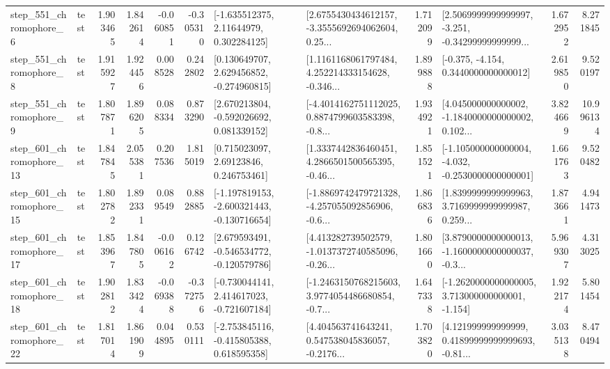\begin{tabular}{llrrrrllrlrr}
   step\_551\_chromophore\_6 &      test &      1.903465 &    1.842614 &     -0.060851 & -0.305310 &     [-1.635512375, 2.11644979, 0.302284125] &  [2.6755430434612157, -3.3555692694062604, 0.25... &       1.712099 &  [2.5069999999999997, -3.251, -0.34299999999999... &            1.672952 &          8.271845 \\
   step\_551\_chromophore\_8 &      test &      1.915927 &    1.924456 &      0.008528 &  0.242802 &    [0.130649707, 2.629456852, -0.274960815] &  [1.1161168061797484, 4.252214333154628, -0.346... &       1.899888 &               [-0.375, -4.154, 0.3440000000000012] &            2.619850 &          9.520197 \\
   step\_551\_chromophore\_9 &      test &      1.807871 &    1.896205 &      0.088334 &  0.873290 &    [2.670213804, -0.592026692, 0.081339152] &  [-4.4014162751112025, 0.8874799603583398, -0.8... &       1.934921 &  [4.045000000000002, -1.1840000000000002, 0.102... &            3.824669 &         10.996134 \\
  step\_601\_chromophore\_13 &      test &      1.847845 &    2.055381 &      0.207536 &  1.815019 &      [0.715023097, 2.69123846, 0.246753461] &  [1.3337442836460451, 4.2866501500565395, -0.46... &       1.851521 &  [-1.105000000000004, -4.032, -0.2530000000000001] &            1.661763 &          9.520482 \\
  step\_601\_chromophore\_15 &      test &      1.802782 &    1.892331 &      0.089549 &  0.882885 &  [-1.197819153, -2.600321443, -0.130716654] &  [-1.8869742479721328, -4.257055092856906, -0.6... &       1.866836 &  [1.8399999999999963, 3.7169999999999987, 0.259... &            1.873661 &          4.941473 \\
  step\_601\_chromophore\_17 &      test &      1.853967 &    1.847805 &     -0.006162 &  0.126742 &   [2.679593491, -0.546534772, -0.120579786] &  [4.413282739502579, -1.0137372740585096, -0.26... &       1.801660 &  [3.8790000000000013, -1.1600000000000037, -0.3... &            5.969307 &          4.313025 \\
  step\_601\_chromophore\_18 &      test &      1.902812 &    1.833424 &     -0.069388 & -0.372756 &   [-0.730044141, 2.414617023, -0.721607184] &  [-1.2463150768215603, 3.9774054486680854, -0.7... &       1.647338 &   [-1.2620000000000005, 3.713000000000001, -1.154] &            1.922174 &          5.801454 \\
  step\_601\_chromophore\_22 &      test &      1.817014 &    1.861909 &      0.044895 &  0.530111 &   [-2.753845116, -0.415805388, 0.618595358] &  [4.404563741643241, 0.547538045836057, -0.2176... &       1.703820 &  [4.121999999999999, 0.41899999999999693, -0.81... &            3.035138 &          8.470494 \\

\end{tabular}
